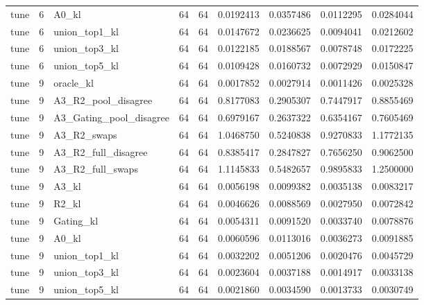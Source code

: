 \begin{tabular}{lrlrrrrrr}
tune & 6 & A0_kl & 64 & 64 & 0.0192413 & 0.0357486 & 0.0112295 & 0.0284044 \\
tune & 6 & union_top1_kl & 64 & 64 & 0.0147672 & 0.0236625 & 0.0094041 & 0.0212602 \\
tune & 6 & union_top3_kl & 64 & 64 & 0.0122185 & 0.0188567 & 0.0078748 & 0.0172225 \\
tune & 6 & union_top5_kl & 64 & 64 & 0.0109428 & 0.0160732 & 0.0072929 & 0.0150847 \\
tune & 9 & oracle_kl & 64 & 64 & 0.0017852 & 0.0027914 & 0.0011426 & 0.0025328 \\
tune & 9 & A3_R2_pool_disagree & 64 & 64 & 0.8177083 & 0.2905307 & 0.7447917 & 0.8855469 \\
tune & 9 & A3_Gating_pool_disagree & 64 & 64 & 0.6979167 & 0.2637322 & 0.6354167 & 0.7605469 \\
tune & 9 & A3_R2_swaps & 64 & 64 & 1.0468750 & 0.5240838 & 0.9270833 & 1.1772135 \\
tune & 9 & A3_R2_full_disagree & 64 & 64 & 0.8385417 & 0.2847827 & 0.7656250 & 0.9062500 \\
tune & 9 & A3_R2_full_swaps & 64 & 64 & 1.1145833 & 0.5482657 & 0.9895833 & 1.2500000 \\
tune & 9 & A3_kl & 64 & 64 & 0.0056198 & 0.0099382 & 0.0035138 & 0.0083217 \\
tune & 9 & R2_kl & 64 & 64 & 0.0046626 & 0.0088569 & 0.0027950 & 0.0072842 \\
tune & 9 & Gating_kl & 64 & 64 & 0.0054311 & 0.0091520 & 0.0033740 & 0.0078876 \\
tune & 9 & A0_kl & 64 & 64 & 0.0060596 & 0.0113016 & 0.0036273 & 0.0091885 \\
tune & 9 & union_top1_kl & 64 & 64 & 0.0032202 & 0.0051206 & 0.0020476 & 0.0045729 \\
tune & 9 & union_top3_kl & 64 & 64 & 0.0023604 & 0.0037188 & 0.0014917 & 0.0033138 \\
tune & 9 & union_top5_kl & 64 & 64 & 0.0021860 & 0.0034590 & 0.0013733 & 0.0030749 \\
\bottomrule
\end{tabular}

